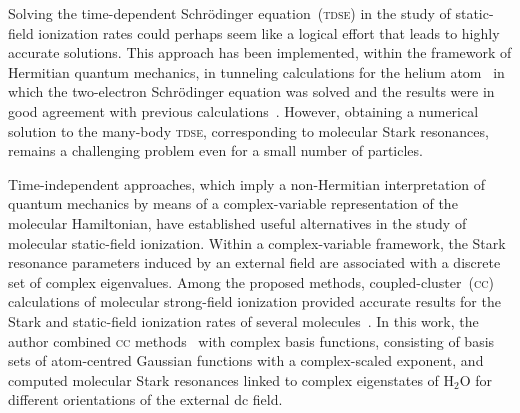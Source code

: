 
Solving the time-dependent Schr\"{o}dinger equation~(\textsc{tdse}) in
the study of static-field ionization rates could perhaps seem like a
logical effort that leads to highly accurate solutions. This approach
has been implemented, within the framework of Hermitian quantum
mechanics, in tunneling calculations for the helium
atom~\cite{static_tdse_He,static_tdse_He_method} in which the
two-electron Schr\"{o}dinger equation was solved and the results were
in good agreement with previous
calculations~\cite{static_He_scrinzi}. However, obtaining a numerical
solution to the many-body \textsc{tdse}, corresponding to molecular
Stark resonances, remains a challenging problem even for a small
number of particles.


Time-independent approaches, which imply a non-Hermitian
interpretation of quantum mechanics by means of a complex-variable
representation of the molecular Hamiltonian, have established useful
alternatives in the study of molecular static-field ionization. Within
a complex-variable framework, the Stark resonance parameters induced
by an external field are associated with a discrete set of complex
eigenvalues. Among the proposed methods, coupled-cluster~(\textsc{cc})
calculations of molecular strong-field ionization provided accurate
results for the Stark and static-field ionization rates of several
molecules~\cite{Jagau_manybody_H2O}. In this work, the author combined
\textsc{cc} methods~\cite{cc_method} with complex basis functions,
consisting of basis sets of atom-centred Gaussian functions with a
complex-scaled exponent, and computed molecular Stark resonances
linked to complex eigenstates of H$_{2}$O for different orientations
of the external dc field.


